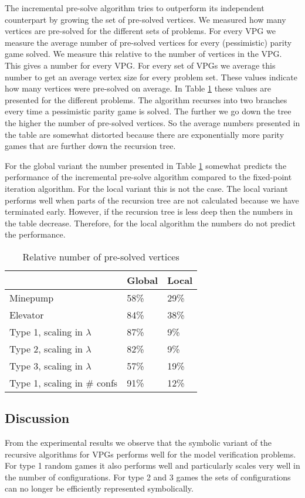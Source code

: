 The incremental pre-solve algorithm tries to outperform its independent counterpart by growing the set of pre-solved vertices. We measured how many vertices are pre-solved for the different sets of problems. For every VPG we measure the average number of pre-solved vertices for every (pessimistic) parity game solved. We measure this relative to the number of vertices in the VPG. This gives a number for every VPG. For every set of VPGs we average this number to get an average vertex size for every problem set. These values indicate how many vertices were pre-solved on average. In Table \ref{tab_mean_presolved} these values are presented for the different problems. The algorithm recurses into two branches every time a pessimistic parity game is solved. The further we go down the tree the higher the number of pre-solved vertices. So the average numbers presented in the table are somewhat distorted because there are exponentially more parity games that are further down the recursion tree.

For the global variant the number presented in Table \ref{tab_mean_presolved} somewhat predicts the performance of the incremental pre-solve algorithm compared to the fixed-point iteration algorithm. For the local variant this is not the case. The local variant performs well when parts of the recursion tree are not calculated because we have terminated early. However, if the recursion tree is less deep then the numbers in the table decrease. Therefore, for the local algorithm the numbers do not predict the performance.

\begin{table}[h]
	\centering
	\begin{tabular}{|l|l|l|}
		\hline
		& Global & Local \\ \hline
		Minepump& 58\%& 29\%\\ \hline
		Elevator& 84\% & 38\%\\ \hline
		Type 1, scaling in $\lambda$& 87\%& 9\%\\ \hline
		Type 2, scaling in $\lambda$& 82\%& 9\%\\ \hline
		Type 3, scaling in $\lambda$& 57\%& 19\%\\ \hline
		Type 1, scaling in \# confs& 91\%& 12\%\\ \hline
	\end{tabular}
	\caption{Relative number of pre-solved vertices}
	\label{tab_mean_presolved}
\end{table}

\subsection{Discussion}
From the experimental results we observe that the symbolic variant of the recursive algorithms for VPGs performs well for the model verification problems. For type 1 random games it also performs well and particularly scales very well in the number of configurations. For type 2 and 3 games the sets of configurations can no longer be efficiently represented symbolically. 


